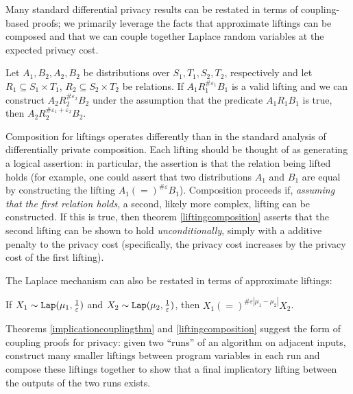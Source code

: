 Many standard differential privacy results can be restated in terms of coupling-based proofs; we primarily leverage the facts that approximate liftings can be composed and that we can couple together Laplace random variables at the expected privacy cost. 

\begin{thm}\label{liftingcomposition}
    Let $A_1, B_2, A_2, B_2$ be distributions over $S_1, T_1, S_2, T_2$, respectively and let $R_1\subseteq S_1\times T_1$, $R_2\subseteq S_2\times T_2$ be relations. If $A_1 R_1^{\#\varepsilon_1}B_1$ is a valid lifting and we can construct $A_2R_2^{\#\varepsilon_2}B_2$ under the assumption that the predicate $A_1 R_1 B_1$ is true, then $A_2 R_2^{\#\varepsilon_1+\varepsilon_2}B_2$.
\end{thm}

Composition for liftings operates differently than in the standard analysis of differentially private composition. Each lifting should be thought of as generating a logical assertion: in particular, the assertion is that the relation being lifted holds (for example, one could assert that two distributions $A_1$ and $B_1$ are equal by constructing the lifting $A_1 (=)^{\#\varepsilon}B_1$). 
Composition proceeds if, \textit{assuming that the first relation holds}, a second, likely more complex, lifting can be constructed. If this is true, then theorem \ref{liftingcomposition} asserts that the second lifting can be shown to hold \textit{unconditionally}, simply with a additive penalty to the privacy cost (specifically, the privacy cost increases by the privacy cost of the first lifting). 


The Laplace mechanism can also be restated in terms of approximate liftings: 
\begin{prop}
    If $X_1\sim\texttt{Lap}(\mu_1, \frac{1}{\varepsilon})$ and $X_2\sim\texttt{Lap}(\mu_2, \frac{1}{\varepsilon})$, then $X_1(=)^{\#\varepsilon|\mu_1-\mu_2|}X_2$.
\end{prop}


Theorems \ref{implicationcouplingthm} and \ref{liftingcomposition} suggest the form of coupling proofs for privacy: given two ``runs'' of an algorithm on adjacent inputs, construct many smaller liftings between program variables in each run and compose these liftings together to show that a final implicatory lifting between the outputs of the two runs exists. 

